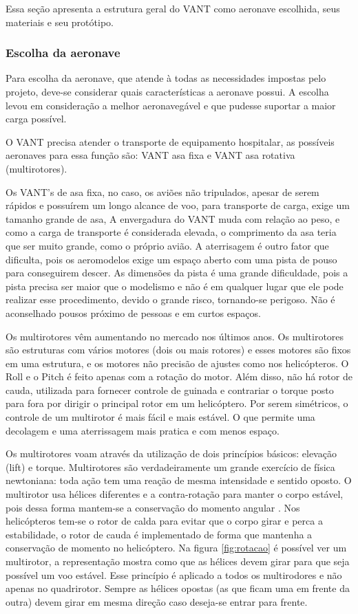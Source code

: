 Essa seção apresenta a estrutura geral do VANT como aeronave escolhida, seus materiais e seu protótipo.
\subsubsection{Escolha da aeronave}

Para escolha da aeronave, que atende à todas as necessidades impostas pelo projeto, deve-se considerar quais características a aeronave possui. A escolha levou em consideração a melhor aeronavegável e que pudesse suportar a maior carga possível.

O VANT precisa atender o transporte de equipamento hospitalar, as possíveis aeronaves para essa função são: VANT asa fixa e VANT asa rotativa (multirotores).

Os VANT’s de asa fixa, no caso, os aviões não tripulados, apesar de serem rápidos e possuírem um longo alcance de voo, para transporte de carga, exige um tamanho grande de asa, A envergadura do VANT muda com relação ao peso, e como a carga de transporte é considerada elevada, o comprimento da asa teria que ser muito grande, como o próprio avião. A aterrisagem é outro fator que dificulta, pois os aeromodelos exige um espaço aberto com uma pista de pouso para conseguirem descer. As dimensões da pista é uma grande dificuldade, pois a pista precisa ser maior que o modelismo e não é em qualquer lugar que ele pode realizar esse procedimento, devido o grande risco, tornando-se perigoso. Não é aconselhado pousos próximo de pessoas e em curtos espaços.

Os multirotores vêm aumentando no mercado nos últimos anos. Os multirotores são estruturas com vários motores (dois ou mais rotores) e esses motores são fixos em uma estrutura, e os motores não precisão de ajustes como nos helicópteros. O Roll e o Pitch é feito apenas com a rotação do motor. Além disso, não há rotor de cauda, utilizada para fornecer controle de guinada e contrariar o torque posto para fora por dirigir o principal rotor em um helicóptero. Por serem simétricos, o controle de um multirotor é mais fácil e mais estável. O que permite uma decolagem e uma aterrissagem mais pratica e com menos espaço.

Os multirotores voam através da utilização de dois princípios básicos: elevação (lift) e torque. Multirotores são verdadeiramente um grande exercício de física newtoniana: toda ação tem uma reação de mesma intensidade e sentido oposto. O multirotor usa  hélices diferentes e a contra-rotação para  manter o corpo  estável, pois dessa forma mantem-se a conservação do momento angular \cite{audronis}. Nos helicópteros tem-se o rotor de calda para evitar que o corpo girar e perca a estabilidade, o rotor de cauda é implementado de forma que mantenha a conservação de momento no helicóptero. 
Na figura \ref{fig:rotacao} é possível ver um multirotor, a representação mostra como que as hélices devem girar para que seja possível um voo estável. Esse princípio é aplicado a todos os multirodores e não apenas no quadrirotor. Sempre as hélices opostas (as que ficam uma em frente da outra) devem girar em mesma direção caso deseja-se entrar para frente.


